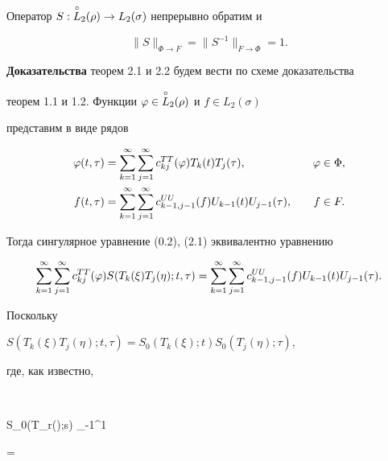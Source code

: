 \begin{thms}


Оператор $S:\overset{\circ}{L}{}_2(\rho)\to L_2(\sigma)$ непрерывно обратим и 


$$


\|S\|_{\Phi\to F} = \|S^{-1}\|_{F\to \Phi} = 1.


$$


\end{thms}





{\bf Доказательства} теорем 2.1 и 2.2 будем вести по схеме доказательства 


теорем 1.1 и 1.2. Функции $\varphi\in \overset{\circ}{L}{}_2(\rho)$ и $f\in L_2(\sigma)$ 


представим в виде рядов


\begin{alignat}{2}


\vp(t,\tau) &= \suml_{k=1}^\infty\suml_{j=1}^\infty c_{kj}^{TT}(\vp) T_k(t)


T_j(\tau),&\quad \vp&\in \Phi,\\


%


f(t,\tau) &= \suml_{k=1}^\infty\suml_{j=1}^\infty c_{k-1,j-1}^{UU}(f)


U_{k-1}(t)U_{j-1}(\tau),&\quad f &\in F.


\end{alignat}


Тогда сингулярное уравнение (0.2), (2.1) эквивалентно уравнению


\begin{equation}


\suml_{k=1}^\infty\suml_{j=1}^\infty c_{kj}^{TT}(\vp)


S(T_k(\xi)T_j(\eta);t,\tau) = 


\suml_{k=1}^\infty\suml_{j=1}^\infty c_{k-1,j-1}^{UU}(f)


U_{k-1}(t)U_{j-1}(\tau).


\end{equation}


Поскольку


$S(T_k(\xi)T_j(\eta);t,\tau) = S_0(T_k(\xi);t)S_0(T_j(\eta);\tau)$,


где, как известно,


$$


S_0(T_r(\sigma);s) \equiv {}\int_{-1}^{1}


 = 


